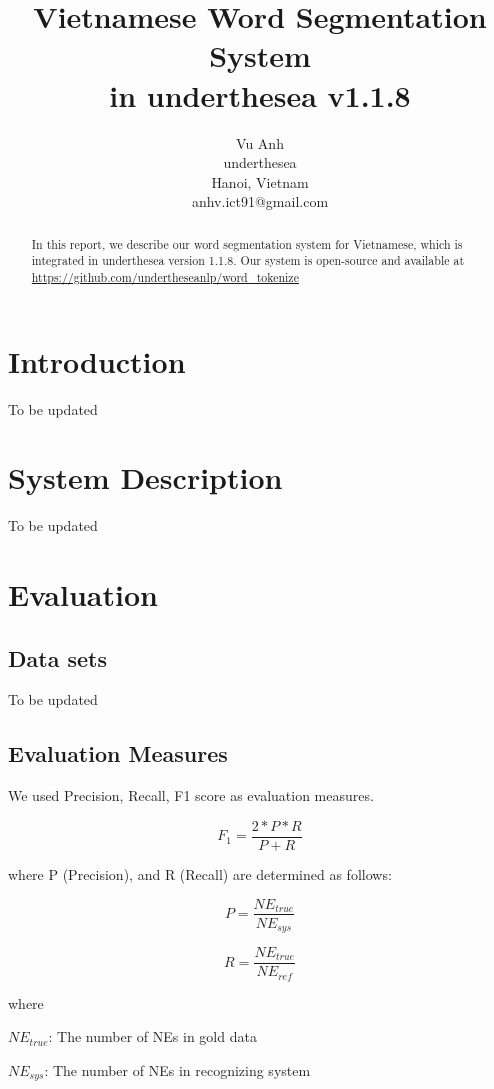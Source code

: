 \documentclass[11pt,a4paper]{article}
\title{Vietnamese Word Segmentation System \\ in underthesea v1.1.8}
\author{
Vu Anh\\
underthesea\\
Hanoi, Vietnam\\
anhv.ict91@gmail.com
}
\date{}
\begin{document}
\maketitle
\begin{abstract}
In this report, we describe our word segmentation system for Vietnamese, which is integrated in underthesea version 1.1.8.
Our system is open-source and available at \url{https://github.com/undertheseanlp/word_tokenize}

\end{abstract}

\section{Introduction}

To be updated

\section{System Description}

To be updated

\section{Evaluation}

\subsection{Data sets}

To be updated


\subsection{Evaluation Measures}

We used Precision, Recall, F1 score as evaluation measures.

$$F_1 = \frac{2*P*R}{P + R}$$

where P (Precision), and R (Recall) are determined as follows:

$$P = \frac{{NE}_{true}}{NE_{sys}}$$

$$R = \frac{{NE}_{true}}{NE_{ref}}$$

where

$NE_{true}$: The number of NEs in gold data

$NE_{sys}$: The number of NEs in recognizing system
\end{document}
